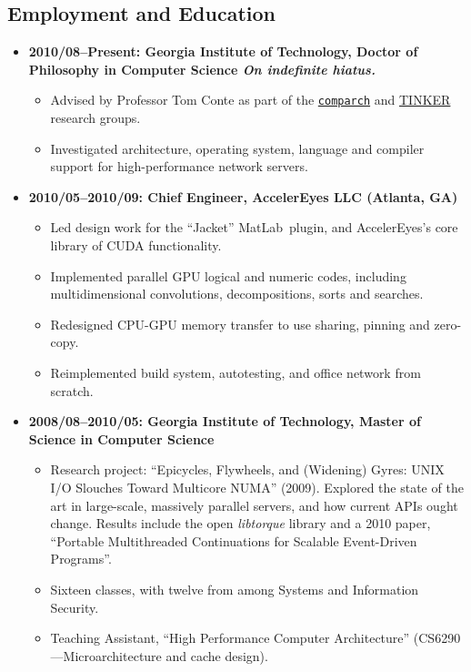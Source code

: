 \documentclass{article}
\newenvironment{tightitemize}
{\begin{itemize}
  \setlength{\itemsep}{1pt}
  \setlength{\parskip}{0pt}
  \setlength{\parsep}{0pt}}
{\end{itemize}}
\begin{document}
\vspace{2mm}
\subsection*{Employment and Education}
\begin{tightitemize}
\item \textbf{2010/08--Present: Georgia Institute of Technology,
Doctor of Philosophy in Computer Science
\hfill \tiny\textit{On indefinite hiatus.}}
\footnotesize
\begin{tightitemize}
\item Advised by Professor Tom Conte as part of the \href{http://comparch.gatech.edu/}{\texttt{comparch}} and \href{http://tinker.cc.gatech.edu/}{TINKER} research groups.
\item Investigated architecture, operating system, language and compiler support for high-performance network servers.\\
\end{tightitemize}

\item \textbf{2010/05--2010/09: Chief Engineer, AccelerEyes LLC (Atlanta, GA)}
\begin{tightitemize}
\item Led design work for the ``Jacket'' MatLab\textregistered\ plugin, and AccelerEyes's core library of CUDA functionality.
\item Implemented parallel GPU logical and numeric codes, including multidimensional convolutions, decompositions, sorts and searches.
\item Redesigned CPU-GPU memory transfer to use sharing, pinning and zero-copy.
\item Reimplemented build system, autotesting, and office network from scratch.\\
\end{tightitemize}

\item \textbf{2008/08--2010/05: Georgia Institute of Technology, Master of Science in Computer Science}
\begin{tightitemize}
\item Research project: ``Epicycles, Flywheels, and (Widening) Gyres: UNIX I/O
  Slouches Toward Multicore NUMA'' (2009). Explored the state of the art in
  large-scale, massively parallel servers, and how current APIs ought
  change. Results include the open \textit{libtorque} library and a 2010 paper,
  ``Portable Multithreaded Continuations for Scalable Event-Driven Programs''.
\item Sixteen classes, with twelve from among Systems and Information Security.
\item Teaching Assistant, ``High Performance Computer Architecture'' (CS6290---Microarchitecture and cache design).\\
\end{tightitemize}


\end{tightitemize}
\end{document}
